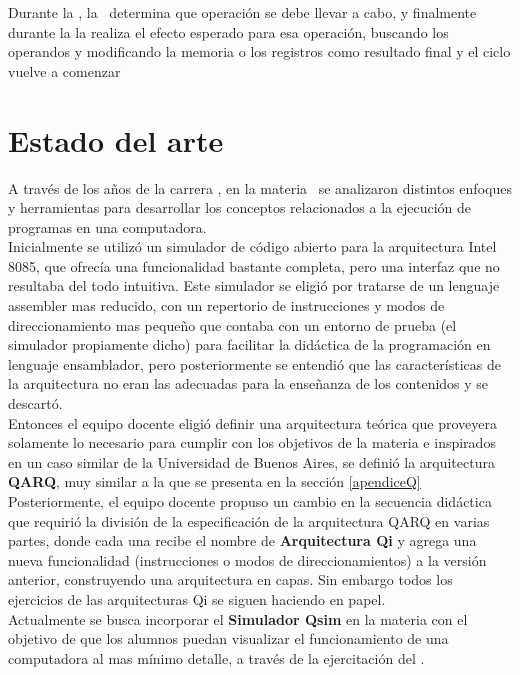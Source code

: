 Durante la \DI, la \UC\ determina que operación se debe llevar a cabo, y finalmente durante la \EI la \UC realiza el efecto esperado para esa operación, buscando los operandos y modificando la memoria o los registros como resultado final y el ciclo vuelve a comenzar

\section{Estado del arte}

A través de los años de la carrera \tpi, en la materia \orga\ se analizaron distintos enfoques y herramientas para desarrollar los conceptos relacionados a la ejecución de programas en una computadora.\\

Inicialmente se utilizó un simulador de código abierto para la arquitectura Intel 8085, que ofrecía una funcionalidad bastante completa, pero una interfaz que no resultaba del todo intuitiva.
Este simulador se eligió por tratarse de un lenguaje assembler mas reducido, con un repertorio de instrucciones y modos de direccionamiento mas pequeño que contaba con un entorno de prueba (el simulador propiamente dicho) para facilitar la didáctica de la programación en lenguaje ensamblador, pero posteriormente se entendió que las características de la arquitectura no eran las adecuadas para la enseñanza de los contenidos y se descartó.\\
 
Entonces el equipo docente eligió definir una arquitectura teórica que proveyera solamente lo necesario para cumplir con los objetivos de la materia e inspirados en un caso similar de la Universidad de Buenos Aires, se definió la arquitectura \textbf{QARQ}, muy similar a la que se presenta en la sección \ref{apendiceQ}\\


Posteriormente, el equipo docente propuso un cambio en la secuencia didáctica que requirió la división de la especificación de la arquitectura QARQ en varias partes, donde cada una recibe el nombre de \textbf{Arquitectura Qi} y agrega una nueva funcionalidad (instrucciones o modos de direccionamientos) a la versión anterior, construyendo una arquitectura en capas. Sin embargo todos los ejercicios de las arquitecturas Qi se siguen haciendo en papel. \\

Actualmente se busca incorporar el \textbf{Simulador Qsim} en la materia con el objetivo de que los alumnos puedan visualizar el funcionamiento de una computadora al mas mínimo detalle, a través de la ejercitación del \ciclo.

